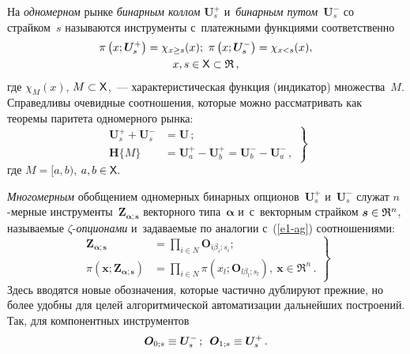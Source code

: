 \begin{multicols}{2}
  На \textit{одномерном} рынке \textit{бинарным коллом} $\boldsymbol{U}_s^+$ 
и~\textit{бинарным путом}~$\boldsymbol{U}_s^-$ со страйком~$s$ называются 
инструменты с~платежными функциями соответственно 
  \begin{multline}
  \pi\left( x;\boldsymbol{U}_s^+\right) =\chi_{x\geq s}(x);\
  \pi\left( x; \boldsymbol{U}_s^-\right) =\chi_{x<s}(x),\\
   x,s\in{\sf X}\subset \mathfrak{R}\,,
  \label{e3-ag}
  \end{multline}
где $\chi_M(x)$, $M\subset {\sf X}$,~--- характеристическая функция 
(индикатор) множества~$M$. Справедливы очевидные соотношения, которые 
можно рассматривать как теоремы паритета одномерного рынка: 
\begin{equation}
\left.
\begin{array}{rl}
\boldsymbol{U}_s^+ +\boldsymbol{U}_s^- &=\boldsymbol{U}\,;\\[6pt]
\boldsymbol{H}\{M\}&=\boldsymbol{U}_a^+-\boldsymbol{U}_b^+ = \boldsymbol{U}_b^- - \boldsymbol{U}_a^-\,,
\end{array}
\right\}
\label{e4-ag}
\end{equation}
где
$M=[a,b)$, $a,b\in {\sf X}.$

  \textit{Многомерным} обобщением одномерных бинарных 
опционов~$\boldsymbol{U}_s^+$ и~$\boldsymbol{U}_s^-$ служат $n$-мер\-ные 
инструменты~$\boldsymbol{Z}_{\boldsymbol{\alpha};\boldsymbol{s}}$ векторного типа~$\boldsymbol{\alpha}$ 
и~с~векторным страйком $\boldsymbol{s}\hm\in \mathfrak{R}^n$, называемые  
$\zeta$-\textit{оп\-ци\-о\-на\-ми} и~задаваемые по аналогии с~(\ref{e1-ag}) 
соотношениями: 
  \begin{equation}
  \left.
  \begin{array}{rl}
 \boldsymbol{Z}_{\boldsymbol{\alpha};\boldsymbol{s}}&=\displaystyle\prod\limits_{i\in N} 
\boldsymbol{O}_{i\beta_i;s_i};\\[6pt]
  \pi\left( \boldsymbol{x};\boldsymbol{Z}_{\boldsymbol{\alpha};\boldsymbol{s}}\right) &=\displaystyle\prod\limits_{i\in N} 
\pi\left( x_l;\boldsymbol{O}_{l\beta_l;s_l}\right), \
 \boldsymbol{x}\in \mathfrak{R}^n\,.
 \end{array}
 \right\}
  \label{e6-ag}
  \end{equation}
Здесь вводятся новые обозначения, которые час\-тич\-но дублируют прежние, но 
более удобны для целей алгоритмической автоматизации дальнейших 
построений. Так, для компонентных инструментов
\begin{equation}
\boldsymbol{O}_{0;s}\equiv \boldsymbol{U}_s^-\,;\enskip \boldsymbol{O}_{1;s}\equiv \boldsymbol{U}_s^+\,.
\label{e7-ag}
\end{equation}
  

\end{multicols}
